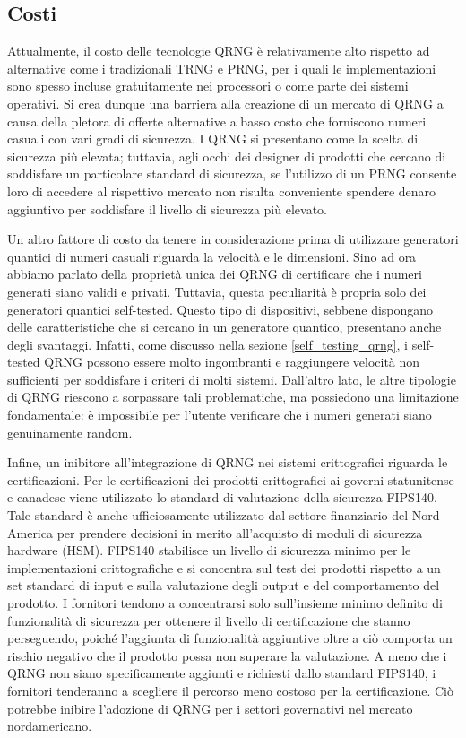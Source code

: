 \subsection{Costi}
Attualmente, il costo delle tecnologie QRNG è relativamente alto rispetto ad alternative come i tradizionali TRNG e PRNG, per i quali le implementazioni sono spesso incluse gratuitamente nei processori o come parte dei sistemi operativi. Si crea dunque una barriera alla creazione di un mercato di QRNG a causa della pletora di offerte alternative a basso costo che forniscono numeri casuali con vari gradi di sicurezza. I QRNG si presentano come la scelta di sicurezza più elevata; tuttavia, agli occhi dei designer di prodotti che cercano di soddisfare un particolare standard di sicurezza, se l'utilizzo di un PRNG consente loro di accedere al rispettivo mercato non risulta conveniente spendere denaro aggiuntivo per soddisfare il livello di sicurezza più elevato. 

Un altro fattore di costo da tenere in considerazione prima di utilizzare generatori quantici di numeri casuali riguarda la velocità e le dimensioni. Sino ad ora abbiamo parlato della proprietà unica dei QRNG di certificare che i numeri generati siano validi e privati. Tuttavia, questa peculiarità è propria solo dei generatori quantici self-tested. Questo tipo di dispositivi, sebbene dispongano delle caratteristiche che si cercano in un generatore quantico, presentano anche degli svantaggi. Infatti, come discusso nella sezione \ref{self_testing_qrng}, i self-tested QRNG possono essere molto ingombranti e raggiungere velocità non sufficienti per soddisfare i criteri di molti sistemi. Dall'altro lato, le altre tipologie di QRNG riescono a sorpassare tali problematiche, ma possiedono una limitazione fondamentale: è impossibile per l'utente verificare che i numeri generati siano genuinamente random. 

Infine, un inibitore all'integrazione di QRNG nei sistemi crittografici riguarda le certificazioni. Per le certificazioni dei prodotti crittografici ai governi statunitense e canadese viene utilizzato lo standard di valutazione della sicurezza FIPS140. Tale standard è anche ufficiosamente utilizzato dal settore finanziario del Nord America per prendere decisioni in merito all'acquisto di moduli di sicurezza hardware (HSM). FIPS140 stabilisce un livello di sicurezza minimo per le implementazioni crittografiche e si concentra sul test dei prodotti rispetto a un set standard di input e sulla valutazione degli output e del comportamento del prodotto. I fornitori tendono a concentrarsi solo sull'insieme minimo definito di funzionalità di sicurezza per ottenere il livello di certificazione che stanno perseguendo, poiché l'aggiunta di funzionalità aggiuntive oltre a ciò comporta un rischio negativo che il prodotto possa non superare la valutazione. A meno che i QRNG non siano specificamente aggiunti e richiesti dallo standard FIPS140, i fornitori tenderanno a scegliere il percorso meno costoso per la certificazione. Ciò potrebbe inibire l'adozione di QRNG per i settori governativi nel mercato nordamericano.


